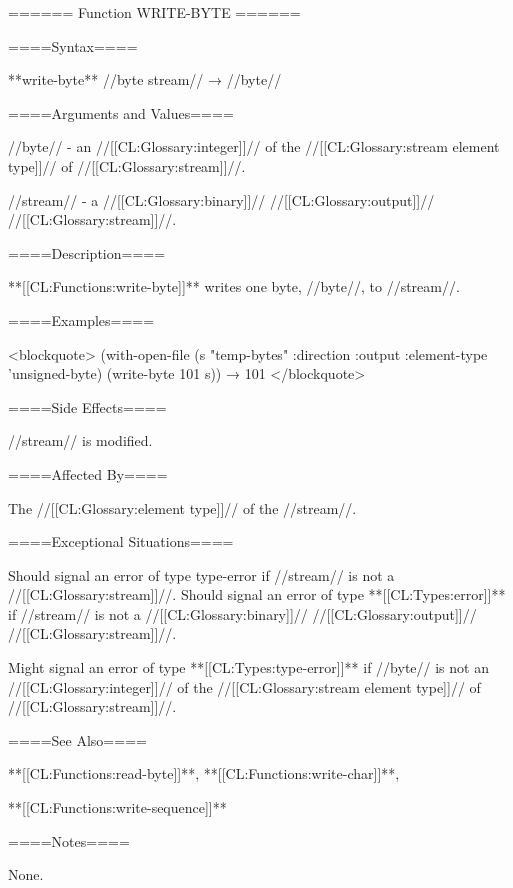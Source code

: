 ====== Function WRITE-BYTE ======

====Syntax====

**{write-byte}** //byte stream// → //byte//

====Arguments and Values====

//byte// - an //[[CL:Glossary:integer]]// of the //[[CL:Glossary:stream element type]]// of //[[CL:Glossary:stream]]//.

//stream// - a //[[CL:Glossary:binary]]// //[[CL:Glossary:output]]// //[[CL:Glossary:stream]]//.

====Description====

**[[CL:Functions:write-byte]]** writes one byte, //byte//, to //stream//.

====Examples====

<blockquote> (with-open-file (s "temp-bytes" :direction :output :element-type 'unsigned-byte) (write-byte 101 s)) → 101 </blockquote>

====Side Effects====

//stream// is modified.

====Affected By====

The //[[CL:Glossary:element type]]// of the //stream//.

====Exceptional Situations====

Should signal an error of type type-error if //stream// is not a //[[CL:Glossary:stream]]//. Should signal an error of type **[[CL:Types:error]]** if //stream// is not a //[[CL:Glossary:binary]]// //[[CL:Glossary:output]]// //[[CL:Glossary:stream]]//.

Might signal an error of type **[[CL:Types:type-error]]** if //byte// is not an //[[CL:Glossary:integer]]// of the //[[CL:Glossary:stream element type]]// of //[[CL:Glossary:stream]]//.

====See Also====

**[[CL:Functions:read-byte]]**, **[[CL:Functions:write-char]]**,

**[[CL:Functions:write-sequence]]**

====Notes====

None.

